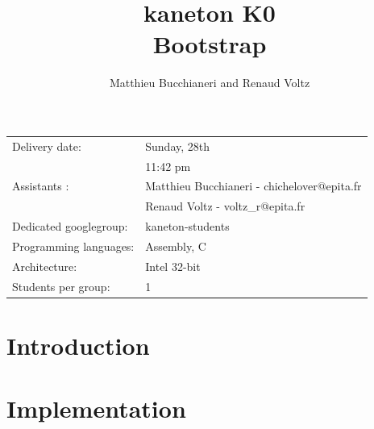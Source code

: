 
%
%


\usepackage{pdfpages}

%
%


%
%

\title{kaneton K0\\Bootstrap}

%
%

\author{\small{Matthieu Bucchianeri} and
        \small{Renaud Voltz}}

%
%



\maketitle

\vspace{5mm}

\begin{tabular}{p{7cm}l}
Delivery date: & Sunday, 28th \\
               & 11:42 pm \\
Assistants : & Matthieu Bucchianeri - \small{chichelover@epita.fr} \\
             & Renaud Voltz - \small{voltz\_r@epita.fr} \\
Dedicated googlegroup: & kaneton-students \\
Programming languages: & Assembly, C \\
Architecture: & Intel 32-bit \\
Students per group: & 1
\end{tabular}

\section*{Introduction}

\newpage


\section*{Implementation}

